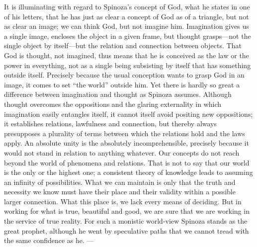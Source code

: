 \documentclass[12pt]{book}
\newcommand{\opage}[1]{\marginnote{\footnotesize\textit{[#1]}}}
\begin{document}
It is illuminating with regard to Spinoza's concept of God, what he states in one of
his letters, that he has just as clear a concept of God as of a triangle, but not as
clear an image; we can think God, but not imagine him. Imagination gives us a single
image, encloses the object in a given frame, but thought grasps---not the single object
by itself---but the relation and connection between objects. That God is thought, not
imagined, thus means that he is conceived as the law or the power in everything, not as
a single being subsisting by itself that has something outside itself. Precisely
because the usual conception wants to grasp God in an image, it comes \opage{59}to set
``the world'' outside him. Yet there is hardly so great a difference between
imagination and thought as Spinoza assumes. Although thought overcomes the oppositions
and the glaring externality in which imagination easily entangles itself, it cannot
itself avoid positing new oppositions; it establishes relations, lawfulness and
connection, but thereby always presupposes a plurality of terms between which the
relations hold and the laws apply. An absolute unity is the absolutely
incomprehensible, precisely because it would not stand in relation to anything
whatever. Our concepts do not reach beyond the world of phenomena and relations. That
is not to say that our world is the only or the highest one; a consistent theory of
knowledge leads to assuming an infinity of possibilities. What we can maintain is only
that the truth and necessity we know must have their place and their validity within a
possible larger connection. What this place is, we lack every means of deciding. But in
working for what is true, beautiful and good, we are sure that we are working in the
service of true reality. For such a monistic world-view Spinoza stands as the great
prophet, although he went by speculative paths that we cannot tread with the same
confidence as he. ---
\end{document}
